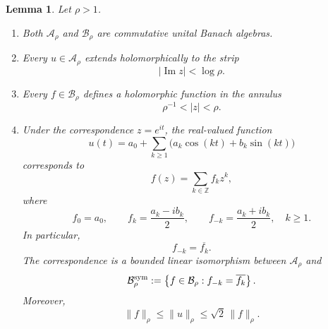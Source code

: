 \documentclass[11pt,a4paper]{amsart}
\newtheorem{lemma}[theorem]{Lemma}
\begin{document}
\begin{lemma}\label{lem:AandB}
	Let $\rho>1$.
	\begin{enumerate}
		\item Both $\mathcal A_\rho$ and $\mathcal B_\rho$ are commutative unital Banach algebras.
		\item
		Every $u\in\mathcal A_\rho$ extends holomorphically to the strip
		\[
		|\operatorname{Im}z|<\log\rho.
		\]
		
		\item
		Every $f\in\mathcal B_\rho$ defines a holomorphic function in the
		annulus
		\[
		\rho^{-1}<|z|<\rho.
		\]
		
		\item
		Under the correspondence $z=e^{it}$, the real-valued function
		\[
		u(t)
		=
		a_0+\sum_{k\ge1}
		\bigl(a_k\cos(kt)+b_k\sin(kt)\bigr)
		\]
		corresponds to
		\[
		f(z)=\sum_{k\in\mathbb Z}f_kz^k,
		\]
		where
		\[
		f_0=a_0,
		\qquad
		f_k=\frac{a_k-ib_k}{2},
		\qquad
		f_{-k}=\frac{a_k+ib_k}{2},
		\quad k\ge1.
		\]
		In particular,
		\[
		f_{-k}=\overline{f_k}.
		\]
		The correspondence is a bounded linear isomorphism between
		$\mathcal A_\rho$ and
		\[
		\mathcal B_\rho^{\rm sym}
		:=
		\left\{
		f\in\mathcal B_\rho:
		f_{-k}=\overline{f_k}
		\right\}.
		\]
		Moreover,
		\[
		\|f\|_\rho
		\le
		\|u\|_\rho
		\le
		\sqrt2\,\|f\|_\rho.
		\]
	\end{enumerate}
\end{lemma}
\end{document}
